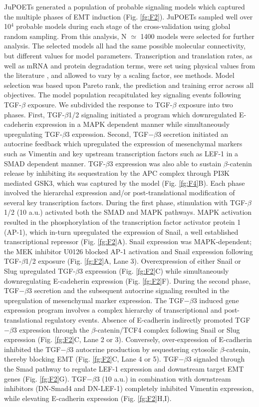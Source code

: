 \documentclass[11pt,letterpaper]{article}
\begin{document}
JuPOETs generated a population of probable signaling models which captured the multiple phases of EMT induction (Fig. \ref{fg:F2}).
JuPOETs sampled well over 10$^4$ probable models during each stage of the cross-validation using global random sampling.
From this analysis, N $\simeq$ 1400 models were selected for further analysis.
The selected models all had the same possible molecular connectivity, but different values for model parameters.
Transcription and translation rates, as well as mRNA and protein degradation terms, were set using physical values from the literature \cite{Milo:2010aa},
and allowed to vary by a scaling factor, see methods.
Model selection was based upon Pareto rank, the prediction and training error across all objectives.
The model population recapitulated key signaling events following TGF-$\beta$ exposure.
We subdivided the response to TGF-$\beta$ exposure into two phases.
First, TGF-$\beta$1/2 signaling initiated a program which downregulated E-cadeherin expression in a MAPK dependent manner while
simultaneously upregulating TGF-$\beta$3 expression. Second, TGF$-\beta$3 secretion initiated an autocrine feedback which upregulated the expression of
mesenchymal markers such as Vimentin and key upstream transcription factors such as LEF-1 in a SMAD dependent manner.
TGF-$\beta$3 expression was also able to sustain $\beta$-catenin release by inhibiting its sequestration by the APC complex through PI3K mediated GSK3,
which was captured by the model (Fig. \ref{fg:F4}B).
Each phase involved the hierarchal expression and/or post-translational modification of several key transcription factors.
During the first phase, stimulation with TGF-$\beta$1/2 (10 a.u.) activated both the SMAD and MAPK pathways.
MAPK activation resulted in the phosphorylation of the transcription factor activator protein 1 (AP-1), which in-turn upregulated the expression of Snail, a well established transcriptional repressor (Fig. \ref{fg:F2}A).
Snail expression was MAPK-dependent; the MEK inhibitor U0126 blocked AP-1 activation and Snail expression following TGF-$\beta$1/2 exposure (Fig. \ref{fg:F2}A, Lane 3).
Overexpression of either Snail or Slug upregulated TGF-$\beta$3 expression (Fig. \ref{fg:F2}C) while simultaneously downregulating E-cadeherin expression (Fig. \ref{fg:F2}F).
During the second phase, TGF$-\beta$3 secretion and the subsequent autocrine signaling resulted in the upregulation of mesenchymal marker expression.
The TGF$-\beta$3 induced gene expression program involves a complex hierarchy of transcriptional and post-translational regulatory events.
Absence of E-cadherin indirectly promoted TGF$-\beta$3 expression through the $\beta$-catenin/TCF4 complex following Snail or Slug expression (Fig. \ref{fg:F2}C, Lane 2 or 3).
Conversely, over-expression of E-cadherin inhibited the TGF$-\beta$3 autocrine production by sequestering cytosolic $\beta$-catenin, thereby blocking EMT (Fig. \ref{fg:F2}C, Lane 4 or 5).
TGF$-\beta$3 signaled through the Smad pathway to regulate LEF-1 expression and downstream target EMT genes (Fig. \ref{fg:F2}G).
TGF$-\beta$3 (10 a.u.) in combination with downstream inhibitors (DN-Smad4 and DN-LEF-1) completely inhibited Vimentin expression, while elevating E-cadherin expression (Fig. \ref{fg:F2}H,I).
\end{document}
